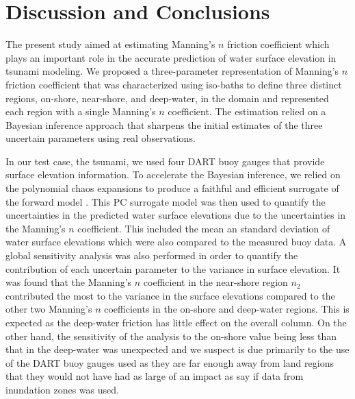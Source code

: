 \section{Discussion and Conclusions}
\label{sec:conc}

The present study aimed at estimating Manning's $n$ friction coefficient  which
plays an important role in the accurate prediction of water surface elevation in
tsunami modeling. We proposed a three-parameter representation of Manning's $n$
friction coefficient that was characterized using iso-baths  to define three
distinct regions, on-shore, near-shore, and deep-water, in the domain and
represented each region with a single Manning's $n$ coefficient.  The estimation
relied on a Bayesian inference approach that sharpens the initial estimates of
the three uncertain parameters using real observations.

In our test case, the \tohoku tsunami, we used four DART buoy gauges that
provide  surface elevation information.  To accelerate the Bayesian inference,
we relied on the polynomial  chaos expansions to produce a faithful and
efficient surrogate of the forward model \geoclaw.  This PC surrogate model was
then used to quantify the uncertainties in the predicted water surface
elevations due to the uncertainties in the Manning's $n$ coefficient.  This
included the mean an standard deviation of water surface elevations which were
also compared to the measured buoy data.  A global sensitivity analysis was also
performed in order to quantify the contribution of each uncertain parameter to
the variance in surface elevation.  It was found that the Manning's $n$
coefficient in the near-shore region $n_2$ contributed the most to the variance
in the surface elevations compared to the other two Manning's $n$ coefficients
in the on-shore and deep-water regions.  This is expected as the deep-water
friction has little effect on the overall column.  On the other hand, the
sensitivity of the analysis to the on-shore value being less than that in the
deep-water was unexpected and we suspect is due primarily to the use of the
DART buoy gauges used as they are far enough away from land regions that they
would not have had as large of an impact as say if data from inundation zones
was used.


